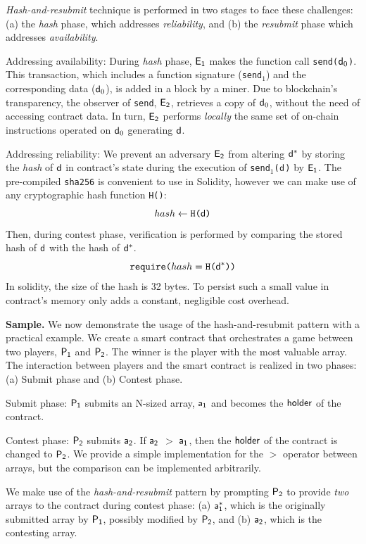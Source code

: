\noindent
\emph{Hash-and-resubmit} technique is performed in two
stages to face these challenges: (a) the \emph{hash} phase, which addresses
\emph{reliability}, and (b) the \emph{resubmit} phase which addresses
\emph{availability}.

\noindent \textsf{Addressing availability:} During \emph{hash} phase,
$\mathsf{E_{1}}$ makes the function call \texttt{send($\mathsf{d}_0$)}. This transaction,
which includes a function signature (\texttt{send$_1$}) and the corresponding
data ($\mathsf{d}_0$), is added in a block by a miner. Due to blockchain's
transparency, the observer of \texttt{send}, $\mathsf{E_{2}}$, retrieves a copy of
$\mathsf{d}_0$, without the need of accessing contract data. In turn, $\mathsf{E_{2}}$
performs \emph{locally} the same set of on-chain instructions operated on
$\mathsf{d}_0$ generating $\mathsf{d}$.

\noindent \textsf{Addressing reliability:} We prevent an adversary $\mathsf{E_{2}}$
from altering $\mathsf{d^*}$ by storing the \emph{hash} of $\mathsf{d}$ in contract's
state during the execution of \texttt{send$_1$($\mathsf{d}$)} by $\mathsf{E_{1}}$.  The
pre-compiled \texttt{sha256} is convenient to  use in Solidity, however we can
make use of any cryptographic hash function \texttt{H()}: \[hash \gets
\texttt{H(}\mathsf{d}\texttt{)}\] Then, during contest phase, verification is
performed by comparing the stored hash of $\mathsf{d}$ with the hash of $\mathsf{d^*}$.
\[\texttt{require(}hash = \texttt{H(}\mathsf{d^*}\texttt{))}\] \noindent In solidity,
the size of the hash is 32 bytes. To persist such a small value in contract's
memory only adds a constant, negligible cost overhead.

\noindent \textbf{Sample.} We now demonstrate the usage of the
hash-and-resubmit pattern with a practical example. We create a smart contract
that orchestrates a game between two players, $\mathsf{P_1}$ and $\mathsf{P_2}$. The winner is
the player with the most valuable array. The interaction between players and
the smart contract is realized in two phases: (a) Submit phase and (b) Contest
phase.

\noindent \textsf{Submit phase:} $\mathsf{P_1}$ submits an N-sized array, $\mathsf{a_1}$ and
becomes the $\mathsf{holder}$ of the contract.

\noindent \textsf{Contest phase:} $\mathsf{P_2}$ submits $\mathsf{a_2}$. If $\mathsf{a_2}$ $>$
$\mathsf{a_1}$, then the $\mathsf{holder}$ of the contract is changed to $\mathsf{P_2}$. We provide a
simple implementation for the $>$ operator between arrays, but the comparison
can be implemented arbitrarily.

We make use of the \emph{hash-and-resubmit} pattern by prompting $\mathsf{P_2}$ to
provide \emph{two} arrays to the contract during contest phase: (a) $\mathsf{a_1^*}$,
which is the originally submitted array by $\mathsf{P_1}$, possibly modified by $\mathsf{P_2}$,
and (b) $\mathsf{a_2}$, which is the contesting array.

